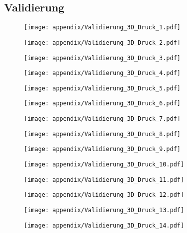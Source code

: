 \begin{appendix}
\subsection{Validierung}
\label{app:Validierung}
\begin{figure}[H]
	\centering
	\texttt{[image: appendix/Validierung\_3D\_Druck\_1.pdf]}
\end{figure}
\begin{figure}[h]
	\centering
	\texttt{[image: appendix/Validierung\_3D\_Druck\_2.pdf]}
\end{figure}
\begin{figure}[h]
	\centering
	\texttt{[image: appendix/Validierung\_3D\_Druck\_3.pdf]}
\end{figure}
\begin{figure}[h]
	\centering
	\texttt{[image: appendix/Validierung\_3D\_Druck\_4.pdf]}
\end{figure}
\begin{figure}[h]
	\centering
	\texttt{[image: appendix/Validierung\_3D\_Druck\_5.pdf]}
\end{figure}
\begin{figure}[h]
	\centering
	\texttt{[image: appendix/Validierung\_3D\_Druck\_6.pdf]}
\end{figure}
\begin{figure}[h]
	\centering
	\texttt{[image: appendix/Validierung\_3D\_Druck\_7.pdf]}
\end{figure}
\begin{figure}[h]
	\centering
	\texttt{[image: appendix/Validierung\_3D\_Druck\_8.pdf]}
\end{figure}
\begin{figure}[h]
	\centering
	\texttt{[image: appendix/Validierung\_3D\_Druck\_9.pdf]}
\end{figure}
\begin{figure}[h]
	\centering
	\texttt{[image: appendix/Validierung\_3D\_Druck\_10.pdf]}
\end{figure}
\begin{figure}[h]
	\centering
	\texttt{[image: appendix/Validierung\_3D\_Druck\_11.pdf]}
\end{figure}
\begin{figure}[h]
	\centering
	\texttt{[image: appendix/Validierung\_3D\_Druck\_12.pdf]}
\end{figure}\begin{figure}[h]
	\centering
	\texttt{[image: appendix/Validierung\_3D\_Druck\_13.pdf]}
\end{figure}
\begin{figure}[h]
	\centering
	\texttt{[image: appendix/Validierung\_3D\_Druck\_14.pdf]}
\end{figure}



\end{appendix}
